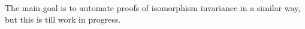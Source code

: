 \documentclass[a4paper]{article}
\theoremstyle{definition}
\theoremstyle{remark}
\begin{document}
The main goal is to automate proofs of isomorphism invariance in a similar way, but this is till work in
progress.

\end{document}
